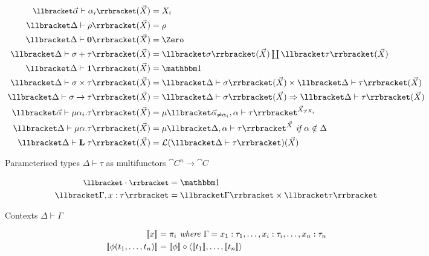 \begin{figure}
\begin{subfigure}{\linewidth}
  \begin{align*}
  \small
  \sem{\vec\alpha \vdash \alpha_i}(\vec X) &=
  X_i
  \\
  \sem{\Delta \vdash \rho}(\vec X) &=
  \rho
  \\
  \sem{\Delta \vdash \tyZero}(\vec X) &=
  \Zero
  \\
  \sem{\Delta \vdash \sigma \tySum \tau}(\vec X) &=
  \textstyle {\sem{\sigma}(\vec X)} \coprod {\sem{\tau}(\vec X)}
  \\
  \sem{\Delta \vdash \tyUnit}(\vec X) &=
  \One
  \\
  \sem{\Delta \vdash \sigma \tyProd \tau}(\vec X) &=
  \sem{\Delta \vdash \sigma}(\vec X) \times \sem{\Delta \vdash \tau}(\vec X)
  \\
  \sem{\Delta \vdash \sigma \tyFun \tau}(\vec X) &=
  \internalHom{\sem{\Delta \vdash \sigma}(\vec X)}{\sem{\Delta \vdash \tau}(\vec X)}
  \\
  \sem{\vec\alpha \vdash \mu\alpha_i.\tau}(\vec X) &=
  \mu\sem{\vec\alpha_{\neq \alpha_i}, \alpha \vdash \tau}^{\vec X_{\neq X_i}}
  \\
  \sem{\Delta \vdash \mu\alpha.\tau}(\vec X) &=
  \mu\sem{\Delta, \alpha \vdash \tau}^{\vec X}
  \textit{ if }\alpha \notin \Delta
  \\
  \sem{\Delta \vdash \tyLift\;\tau}(\vec X) &=
  \mathcal{L}(\sem{\Delta \vdash \tau})(\vec X)
  \end{align*}
  \caption{Parameterised types $\Delta \vdash \tau$ as multifunctors $\cat{C}^n \to \cat{C}$ }
  \label{fig:default-semantics:types}
\end{subfigure}
\begin{subfigure}{\linewidth}
  \begin{align*}
  \small
  \sem{\emptyCxt} &= \One
  \\
  \sem{\Gamma, x: \tau} &= \sem{\Gamma} \times \sem{\tau}
  \end{align*}
  \caption{Contexts $\Delta \vdash \Gamma$}
\end{subfigure}
\begin{subfigure}{\linewidth}
  \begin{align*}
  \small
  \sem{x} &= \pi_i
  \textit{ where }\Gamma = x_1: \tau_1, \ldots, x_i: \tau_i, \ldots, x_n: \tau_n
  \\
  \sem{\phi(t_1, \ldots, t_n)}
  &=
  \sem{\phi} \comp \prodM{\sem{t_1}}{\ldots, \sem{t_n}}

\end{align*}
\end{subfigure}
\end{figure}
